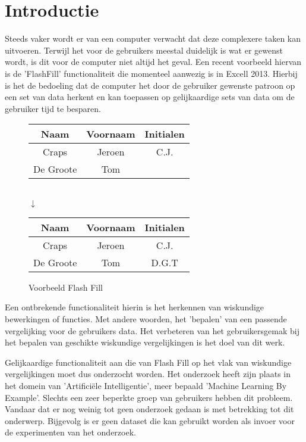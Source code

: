 \documentclass[Main.tex]{subfiles}
\begin{document}
\section{Introductie}
Steeds vaker wordt er van een computer verwacht dat deze complexere taken kan uitvoeren. Terwijl het voor de gebruikers meestal duidelijk is wat er gewenst wordt, is dit voor de computer niet altijd het geval. Een recent voorbeeld hiervan is de 'FlashFill' functionaliteit die momenteel aanwezig is in Excell 2013. Hierbij is het de bedoeling dat de computer het door de gebruiker gewenste patroon op een set van data herkent en kan toepassen op gelijkaardige sets van data om de gebruiker tijd te besparen. \cite{flashFill}

\begin{figure}[!htb]
\centering
\begin{framed}
\begin{tabular}{| c | c | c |}
\hline
Naam & Voornaam & Initialen \\ \hline
Craps & Jeroen & C.J. \\ \hline
De Groote & Tom &  \\ \hline
\end{tabular} \\
$\downarrow$ \\
\begin{tabular}{| c | c | c |}
\hline
Naam & Voornaam & Initialen \\ \hline
Craps & Jeroen & C.J. \\ \hline
De Groote & Tom &  D.G.T \\ \hline
\end{tabular}
\end{framed}
\caption{Voorbeeld Flash Fill}
\label{fig:flashfill}
\end{figure}

\par Een ontbrekende functionaliteit hierin is het herkennen van wiskundige bewerkingen of functies. Met andere woorden, het 'bepalen' van een passende vergelijking voor de gebruikers data. Het verbeteren van het gebruikersgemak bij het bepalen van geschikte wiskundige vergelijkingen is het doel van dit werk. \par  %

Gelijkaardige functionaliteit aan die van Flash Fill op het vlak van wiskundige vergelijkingen moet dus onderzocht worden. Het onderzoek heeft zijn plaats in het domein van 'Artifici\"ele Intelligentie', meer bepaald 'Machine Learning By Example'. Slechts een zeer beperkte groep van gebruikers hebben dit probleem. Vandaar dat er nog weinig tot geen onderzoek gedaan is met betrekking tot dit onderwerp. Bijgevolg is er geen dataset die kan gebruikt worden als invoer voor de experimenten van het onderzoek.  \par
\end{document}
